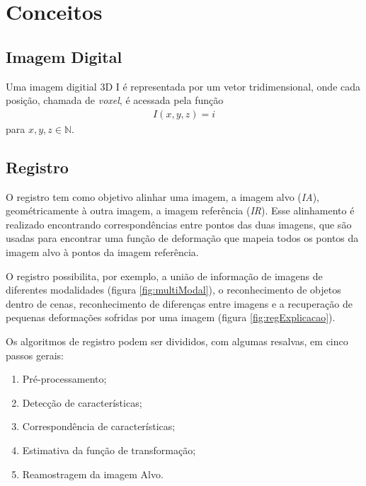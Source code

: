 \chapter{Conceitos}
\label{cap:conceitos}

\section{Imagem Digital}
\label{sec:imagemDigital}

  Uma imagem digitial 3D I é representada por um vetor tridimensional, onde cada
posição, chamada de \textit{voxel}, é acessada pela função
\begin{align}\label{eq:defImagem}
    I(x,y,z) = i
\end{align}
  para $x, y, z \in \mathbb{N}$.

\section{Registro}
\label{sec:fundamentos}

  O registro tem como objetivo alinhar uma imagem, a imagem alvo (\textit{IA}),
geométricamente à outra imagem, a imagem referência (\textit{IR}). Esse
alinhamento é realizado encontrando correspondências entre pontos das duas imagens,
que são usadas para encontrar uma função de deformação que mapeia todos os
pontos da imagem alvo à pontos da imagem referência.

O registro possibilita, por exemplo, a união de informação de imagens de
diferentes modalidades (figura \ref{fig:multiModal}), o reconhecimento de
objetos dentro de cenas, reconhecimento de diferenças entre imagens e
a recuperação de pequenas deformações sofridas por uma imagem (figura
\ref{fig:regExplicacao}).

Os algoritmos de registro podem ser divididos, com algumas resalvas, em cinco
passos gerais:
\begin{enumerate}
    \item Pré-processamento;
    \item Detecção de características;
    \item Correspondência de características;
    \item Estimativa da função de transformação;
    \item Reamostragem da imagem Alvo.
\end{enumerate} %

